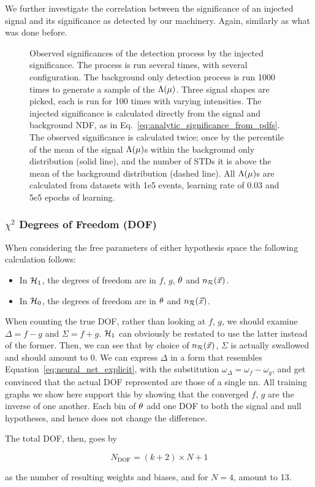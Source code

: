 \documentclass[../../ddppaper2.tex]{subfiles}
\begin{document}
We further investigate the correlation between the significance of an injected signal and its significance as detected by our machinery. Again, similarly as what was done before.

\begin{figure}
    \centering
    \caption{Observed significances of the detection process by the injected significance. The process is run several times, with several configuration. The background only detection process is run 1000 times to generate a sample of the $\Lambda({\mu})$. Three signal shapes are picked, each is run for 100 times with varying intensities. The injected significance is calculated directly from the signal and background NDF, as in Eq.~\ref{eq:analytic_significance_from_pdfs}. The observed significance is calculated twice; once by the percentile of the mean of the signal $\Lambda({\mu})$s within the background only distribution (solid line), and the number of STDs it is above the mean of the background distribution (dashed line). All $\Lambda({\mu})$s are calculated from datasets with 1e5 events, learning rate of 0.03 and 5e5 epochs of learning.}
    \label{fig:observed_vs_injected_significances}
\end{figure}

\subsubsection{\texorpdfstring{$\chi^2$}{Chi-squared} Degrees of Freedom (DOF)}
When considering the free parameters of either hypothesis space the following calculation follows:
\begin{itemize}
    \item In ${\mathcal{H}_{1}}$, the degrees of freedom are in $f$, $g$, ${\theta}$ and $n_{\mathcal{R}}({\vec{{x}}})$.
    \item In ${{\mathcal{H}_{0}}}$, the degrees of freedom are in ${\theta}$ and $n_{\mathcal{R}}({\vec{{x}}})$.
\end{itemize}

When counting the true DOF, rather than looking at $f$, $g$, we should examine $\Delta = f - g$ and $\Sigma = f + g$. ${\mathcal{H}_{1}}$ can obviously be restated to use the latter instead of the former. Then, we can see that by choice of $n_{\mathcal{R}}({\vec{{x}}})$, $\Sigma$ is actually swallowed and should amount to 0. We can express $\Delta$ in a form that resembles Equation~\ref{eq:neural_net_explicit}, with the substitution $\omega_\Delta = \omega_f - \omega_g$, and get convinced that the actual DOF represented are those of a single \gls{nn}.
All training graphs we show here support this by showing that the converged $f$, $g$ are the inverse of one another.
Each bin of ${\theta}$ add one DOF to both the signal and null hypotheses, and hence does not change the difference.

The total DOF, then, goes by

\begin{equation}
    N_\text{DOF} = (k + 2) \times N + 1
\end{equation}

\noindent as the number of resulting weights and biases, and for $N = 4$, amount to 13.
\end{document}
